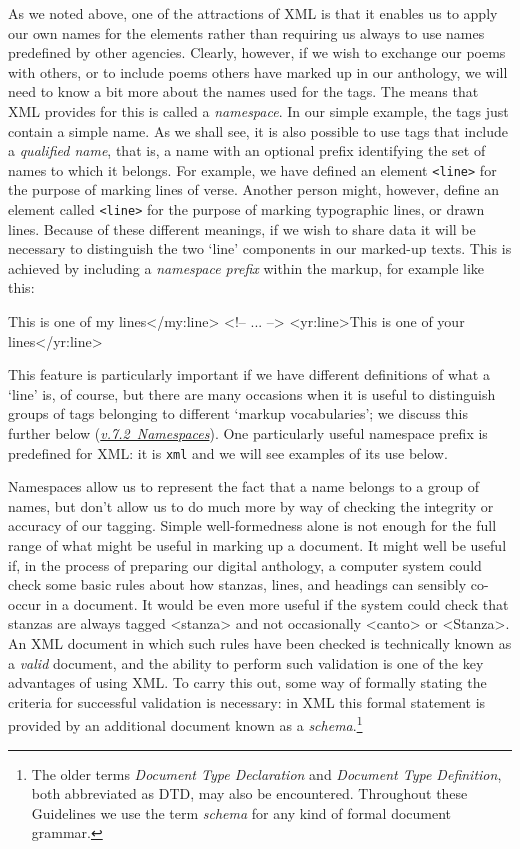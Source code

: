 As we noted above, one of the attractions of XML is that it enables us to apply our own names for the elements rather than requiring us always to use names predefined by other agencies. Clearly, however, if we wish to exchange our poems with others, or to include poems others have marked up in our anthology, we will need to know a bit more about the names used for the tags. The means that XML provides for this is called a \textit{namespace}. In our simple example, the tags just contain a simple name. As we shall see, it is also possible to use tags that include a \textit{qualified name}, that is, a name with an optional prefix identifying the set of names to which it belongs. For example, we have defined an element \texttt{<line>} for the purpose of marking lines of verse. Another person might, however, define an element called \texttt{<line>} for the purpose of marking typographic lines, or drawn lines. Because of these different meanings, if we wish to share data it will be necessary to distinguish the two ‘line’ components in our marked-up texts. This is achieved by including a \textit{namespace prefix} within the markup, for example like this: \par\hfill\bgroup\exampleFont\vskip 10pt\begin{shaded}
This is one of my lines</my:line> \newline
<!-- ... --> \newline
<yr:line>This is one of your lines</yr:line>\end{shaded}
\par\egroup 
 This feature is particularly important if we have different definitions of what a ‘line’ is, of course, but there are many occasions when it is useful to distinguish groups of tags belonging to different ‘markup vocabularies’; we discuss this further below (\textit{\hyperref[SGname]{v.7.2\ Namespaces}}). One particularly useful namespace prefix is predefined for XML: it is \texttt{xml} and we will see examples of its use below.\par
Namespaces allow us to represent the fact that a name belongs to a group of names, but don't allow us to do much more by way of checking the integrity or accuracy of our tagging. Simple well-formedness alone is not enough for the full range of what might be useful in marking up a document. It might well be useful if, in the process of preparing our digital anthology, a computer system could check some basic rules about how stanzas, lines, and headings can sensibly co-occur in a document. It would be even more useful if the system could check that stanzas are always tagged <stanza> and not occasionally <canto> or <Stanza>. An XML document in which such rules have been checked is technically known as a \textit{valid} document, and the ability to perform such validation is one of the key advantages of using XML. To carry this out, some way of formally stating the criteria for successful validation is necessary: in XML this formal statement is provided by an additional document known as a \textit{schema}.\footnote{The older terms \textit{Document Type Declaration} and \textit{Document Type Definition}, both abbreviated as DTD, may also be encountered. Throughout these Guidelines we use the term \textit{schema} for any kind of formal document grammar.}

